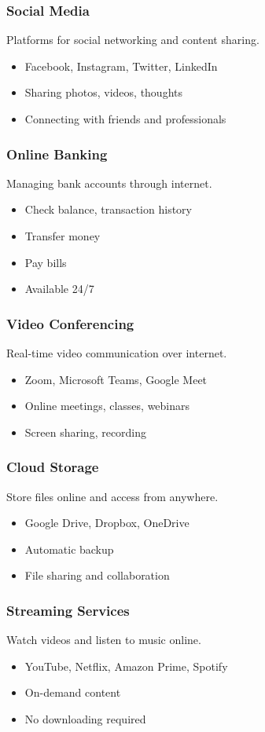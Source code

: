 \documentclass[12pt,a4paper]{article}
\begin{document}
\subsubsection{Social Media}
Platforms for social networking and content sharing.
\begin{itemize}
    \item Facebook, Instagram, Twitter, LinkedIn
    \item Sharing photos, videos, thoughts
    \item Connecting with friends and professionals
\end{itemize}

\subsubsection{Online Banking}
Managing bank accounts through internet.
\begin{itemize}
    \item Check balance, transaction history
    \item Transfer money
    \item Pay bills
    \item Available 24/7
\end{itemize}

\subsubsection{Video Conferencing}
Real-time video communication over internet.
\begin{itemize}
    \item Zoom, Microsoft Teams, Google Meet
    \item Online meetings, classes, webinars
    \item Screen sharing, recording
\end{itemize}

\subsubsection{Cloud Storage}
Store files online and access from anywhere.
\begin{itemize}
    \item Google Drive, Dropbox, OneDrive
    \item Automatic backup
    \item File sharing and collaboration
\end{itemize}

\subsubsection{Streaming Services}
Watch videos and listen to music online.
\begin{itemize}
    \item YouTube, Netflix, Amazon Prime, Spotify
    \item On-demand content
    \item No downloading required
\end{itemize}
\end{document}
